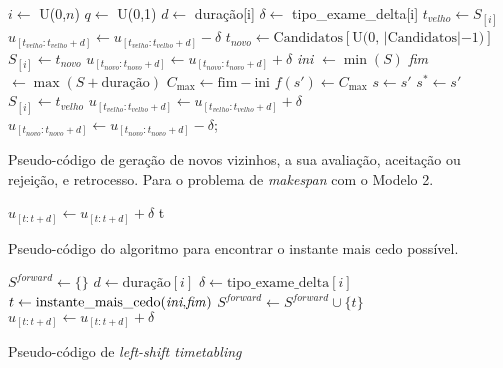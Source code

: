 \begin{algorithm}[H]
\label{algo:P1M1_GV_main_algo}
	$i \gets$ U(0,$n$)\;
    $q \gets$ U(0,1)\;
    $d \gets$ duração[i]\;
    $\delta \gets$ tipo\_exame\_delta[i]\;
    $t_{velho} \gets S_{[i]}$\;
    $u_{[t_{velho}: t_{velho}+d]} \gets u_{[t_{velho}: t_{velho}+d]} - \delta$\;
    $t_{novo} \gets \text{Candidatos}[\text{U(0, |Candidatos}|-1)]$\;
    $S_{[i]} \gets t_{novo}$\;
    $u_{[t_{novo}: t_{novo}+d]} \gets u_{[t_{novo}: t_{novo}+d]} + \delta$\;
    \textit{ini} $\gets \min(S)$\;
    \textit{fim} $\gets \max(S+\text{duração})$\;
    $C_{\max} \gets \text{fim} - \text{ini}$\;
    $f(s') \gets C_{\max}$\;
	{
		$s \gets s'$\;
		{
			$s^* \gets s'$
		}
	}
	\Else
	{
		$S_{[i]} \gets t_{velho}$\;
    	$u_{[t_{velho}: t_{velho}+d]} \gets u_{[t_{velho}: t_{velho}+d]} + \delta$\;
		$u_{[t_{novo}: t_{novo}+d]} \gets u_{[t_{novo}: t_{novo}+d]} - \delta$;\
	}    
    \caption{Pseudo-código de geração de novos vizinhos, a sua avaliação, aceitação ou rejeição, e retrocesso. Para o problema de \textit{makespan} com o Modelo 2.}
\end{algorithm}


\begin{algorithm}[H]
	{
		$u_{[t: t+d]} \gets u_{[t: t+d]} + \delta$\;
		{
			\Return t
		}
	}
    \caption{Pseudo-código do algoritmo para encontrar o instante mais cedo possível.}
    \label{algo:earliest_t}
\end{algorithm}

\begin{algorithm}[H]
    $S^{\textit{forward}} \gets \{\}$\;
    {
        $d \gets \text{duração}[i]$\;
        $\delta \gets \text{tipo\_exame\_delta}[i]$\;
        $t \gets \text{instante\_mais\_cedo(\textit{ini},\textit{fim})}$\;
        $S^{\textit{forward}} \gets S^{\textit{forward}} \cup \{t\}$\;
        $u_{[t: t+d]} \gets u_{[t: t+d]} + \delta$\;
    }
    \caption{Pseudo-código de \textit{left-shift timetabling}}
    \label{algo:left-shift-TT}
\end{algorithm}

